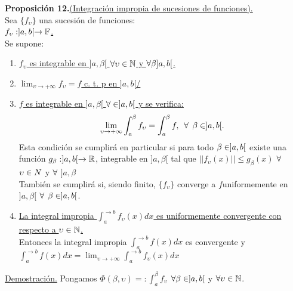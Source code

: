 \textbf{Proposición 12.}\underline{(Integración impropia de sucesiones de funciones).}\\
Sea $\lbrace f_\upsilon \rbrace$ una sucesión de funciones: \\
\underline{$f_\upsilon:]a,b[ \rightarrow \mathbb{F}$.}\\
Se supone:\\

\begin{enumerate}[1)]
\item \underline{$f_\upsilon$ es integrable en $]a,\beta[$ $\forall \upsilon \in \mathbb{N}$ y $\forall \beta ]a,b[$.}
\item \underline{$\lim_{\upsilon \to +\infty}f_\upsilon=f$ c. t. p en $]a,b[$/}
\item \underline{$f$ es integrable en $]a,\beta[$ $\forall \in ]a,b[$ y se verifica:}\\
$$
\lim_{\upsilon \to +\infty}\int_a^{\beta}f_\upsilon=\int_a^\beta f, \phantom{s} \forall \phantom{s} \beta \in ]a,b[.
$$
Esta condición se cumplirá en particular si para todo $\beta \in ]a,b[$ existe una función $g_{\beta}:]a,b[ \rightarrow \mathbb{R}$, integrable en $]a,\beta[$ tal que $|| f_\upsilon(x)|| \leq g_{\beta}(x)$ $\forall$ $\upsilon \in N$ y $\forall$ \x \en $]a,\beta$\\
También se cumplirá si, siendo finito, $\lbrace f_\upsilon\rbrace$ converge a $f$uniformemente en $]a,\beta[$ $\forall$ $\beta \in ]a,b[$.
\item \underline{La integral impropia $\int_a^{\to b} f_\upsilon (x)dx$ es uniformemente convergente con respecto a $\upsilon\in \mathbb{N}$.}\\
Entonces la integral impropia $\int_a^{\to b} f (x)dx$ es convergente y $\int_a^{\to b} f (x)dx=\lim_{\upsilon \to +\infty}\int_a^{\to b}f_\upsilon (x)dx$
\end{enumerate}
\underline{Demostración.}
Pongamos $\Phi(\beta,\upsilon)=: \int_a^\beta f_\upsilon$ $\forall \beta \in ]a,b[$ y $\forall \upsilon \in \mathbb{N}$.\\

